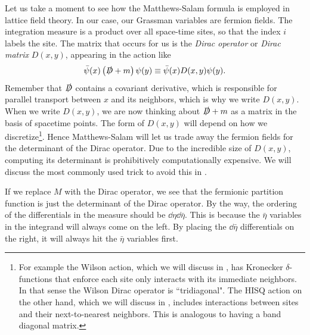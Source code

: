 Let us take a moment to see how the Matthews-Salam formula is employed
in lattice field theory. In our case, our Grassman variables are
fermion fields. The integration measure is a product over all
space-time sites, so that the index $i$ labels the site.
The matrix that occurs for us is the 
{\it Dirac operator}
or {\it Dirac matrix} $D(x,y)$, appearing
in the action like
\begin{equation}\label{eq:diracPositionBasis}
\bar{\psi}(x)\left(\slashed{D}+m\right)\psi(y)
\equiv\bar{\psi}(x)D(x,y)\psi(y).
\end{equation}
Remember that $\slashed{D}$ contains a covariant derivative, which
is responsible for parallel transport between $x$ and its neighbors,
which is why we write $D(x,y)$. When we write $D(x,y)$, we are
now thinking about $\slashed{D}+m$ as a matrix in the basis
of spacetime points. The form of $D(x,y)$ will depend on how we
discretize\footnote{For example the Wilson action, which we will discuss
in , has Kronecker $\delta$-functions that
enforce each site only interacts with its immediate neighbors.
In that sense the Wilson Dirac operator is ``tridiagonal".
The HISQ action on the other hand, which we will discuss in 
, includes interactions between sites and
their next-to-nearest neighbors. This is analogous to having a 
band diagonal matrix.}. Hence Matthews-Salam will let us trade
away the fermion fields for the determinant of the Dirac operator.
Due to the incredible size of $D(x,y)$, computing its determinant
is prohibitively computationally expensive. We will discuss the most
commonly used trick to avoid this in .

If we replace $M$ with the Dirac operator, we see that the fermionic
partition function is just the determinant of the Dirac operator.
By the way, the ordering of the differentials in the measure should
be $\dd{\eta}\dd{\bar{\eta}}$. This is because the $\bar{\eta}$ variables
in the integrand will always come on the left. By placing the
$\dd{\bar{\eta}}$ differentials on the right, it will always hit the
$\bar{\eta}$ variables first.

